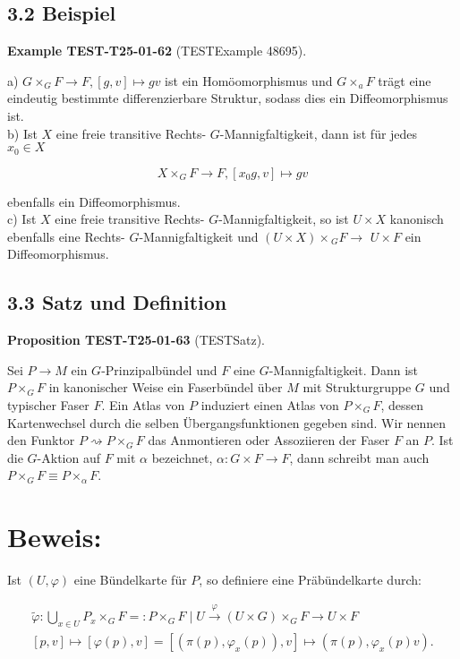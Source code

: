 \documentclass[10pt, letterpaper]{article}
\newcommand{\CustomHeading}[3]{%
  \par\medskip\noindent%
  \textbf{#1 #2} \textnormal{(#3)}.\enskip%
}
\newenvironment{PROP}[2]{\begin{unitbox}\CustomHeading{Proposition}{#1}{#2}}{\end{unitbox}}
\newenvironment{EXA}[2]{\begin{unitbox}\CustomHeading{Example}{#1}{#2}}{\end{unitbox}}
\begin{document}
\subsection*{3.2 Beispiel}
\begin{EXA}{TEST-T25-01-62}{TESTExample 48695}
a) $G \times_{G} F \rightarrow F,[g, v] \mapsto g v$ ist ein Homöomorphismus und $G \times_{a} F$ trägt eine eindeutig bestimmte differenzierbare Struktur, sodass dies ein Diffeomorphismus ist.\\
b) Ist $X$ eine freie transitive Rechts- $G$-Mannigfaltigkeit, dann ist für jedes $x_{0} \in X$

$$
X \times_{G} F \rightarrow F,\left[x_{0} g, v\right] \mapsto g v
$$

ebenfalls ein Diffeomorphismus.\\
c) Ist $X$ eine freie transitive Rechts- $G$-Mannigfaltigkeit, so ist $U \times X$ kanonisch ebenfalls eine Rechts- $G$-Mannigfaltigkeit und $(U \times X) \times{ }_{G} F \rightarrow$ $U \times F$ ein Diffeomorphismus.
\end{EXA}

\subsection*{3.3 Satz und Definition}
\begin{PROP}{TEST-T25-01-63}{TESTSatz}
Sei $P \rightarrow M$ ein $G$-Prinzipalbündel und $F$ eine $G$-Mannigfaltigkeit. Dann ist $P \times_{G} F$ in kanonischer Weise ein Faserbündel über $M$ mit Strukturgruppe $G$ und typischer Faser $F$. Ein Atlas von $P$ induziert einen Atlas von $P \times_{G} F$, dessen Kartenwechsel durch die selben Übergangsfunktionen gegeben sind. Wir nennen den Funktor $P \rightsquigarrow P \times_{G} F$ das Anmontieren oder Assoziieren der Faser $F$ an $P$. Ist die $G$-Aktion auf $F$ mit $\alpha$ bezeichnet, $\alpha: G \times F \rightarrow F$, dann schreibt man auch $P \times_{G} F \equiv P \times_{\alpha} F$.
\end{PROP}

\section*{Beweis:}
Ist $(U, \varphi)$ eine Bündelkarte für $P$, so definiere eine Präbündelkarte durch:


\begin{gather*}
\tilde{\varphi}: \bigcup_{x \in U} P_{x} \times_{G} F=: P \times_{G} F \mid U \xrightarrow{\varphi}(U \times G) \times_{G} F \rightarrow U \times F  \tag{3.1}\\
{[p, v] \mapsto[\varphi(p), v]=\left[\left(\pi(p), \varphi_{x}(p)\right), v\right] \mapsto\left(\pi(p), \varphi_{x}(p) v\right) .}
\end{gather*}
\end{document}
